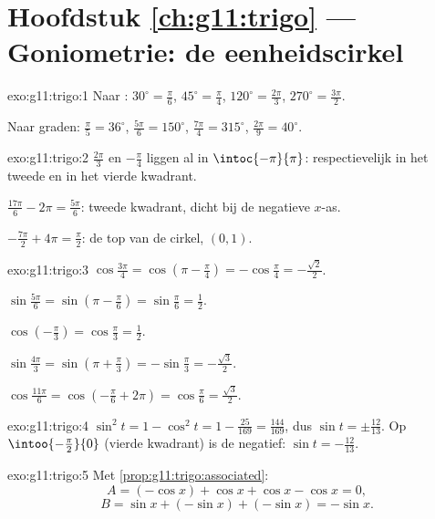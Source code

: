 \section*{Hoofdstuk \ref{ch:g11:trigo} --- Goniometrie: de eenheidscirkel}

\begin{solution}{exo:g11:trigo:1}
Naar : $30^\circ = \frac{\pi}{6}$, $45^\circ = \frac{\pi}{4}$,
$120^\circ = \frac{2\pi}{3}$, $270^\circ = \frac{3\pi}{2}$.

Naar graden: $\frac{\pi}{5} = 36^\circ$, $\frac{5\pi}{6} = 150^\circ$,
$\frac{7\pi}{4} = 315^\circ$, $\frac{2\pi}{9} = 40^\circ$.
\end{solution}

\begin{solution}{exo:g11:trigo:2}
$\frac{2\pi}{3}$ en $-\frac{\pi}{4}$ liggen al in $\intoc{-\pi}{\pi}$:
respectievelijk in het tweede en in het vierde kwadrant.

$\frac{17\pi}{6} - 2\pi = \frac{5\pi}{6}$: tweede kwadrant, dicht bij de
negatieve $x$-as.

$-\frac{7\pi}{2} + 4\pi = \frac{\pi}{2}$: de top van de cirkel, $(0, 1)$.
\end{solution}

\begin{solution}{exo:g11:trigo:3}
$\cos\frac{3\pi}{4} = \cos\left(\pi - \frac\pi4\right) = -\cos\frac\pi4
= -\frac{\sqrt2}{2}$.

$\sin\frac{5\pi}{6} = \sin\left(\pi - \frac\pi6\right) = \sin\frac\pi6
= \frac12$.

$\cos\left(-\frac\pi3\right) = \cos\frac\pi3 = \frac12$.

$\sin\frac{4\pi}{3} = \sin\left(\pi + \frac\pi3\right) = -\sin\frac\pi3
= -\frac{\sqrt3}{2}$.

$\cos\frac{11\pi}{6} = \cos\left(-\frac\pi6 + 2\pi\right) = \cos\frac\pi6
= \frac{\sqrt3}{2}$.
\end{solution}

\begin{solution}{exo:g11:trigo:4}
$\sin^2 t = 1 - \cos^2 t = 1 - \frac{25}{169} = \frac{144}{169}$, dus
$\sin t = \pm\frac{12}{13}$. Op $\intoo{-\frac\pi2}{0}$ (vierde kwadrant) is
de  negatief: $\sin t = -\frac{12}{13}$.
\end{solution}

\begin{solution}{exo:g11:trigo:5}
Met \cref{prop:g11:trigo:associated}:
\[
A = (-\cos x) + \cos x + \cos x - \cos x = 0 ,
\]
\[
B = \sin x + (-\sin x) + (-\sin x) = -\sin x .
\]
\end{solution}

